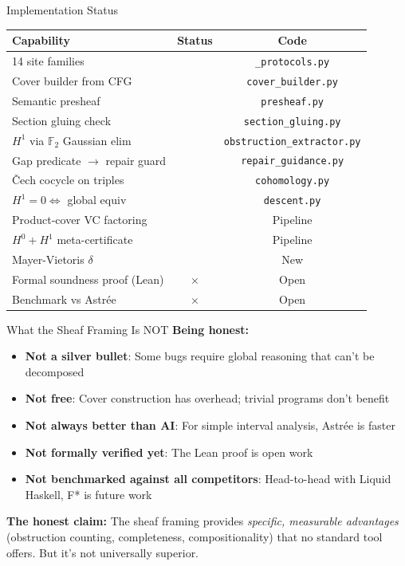 \documentclass[aspectratio=169,10pt]{beamer}
\newcommand{\yes}{\textcolor{good}{\checkmark}}
\newcommand{\no}{\textcolor{meh}{$\times$}}
\begin{document}
\begin{frame}{Implementation Status}
\renewcommand{\arraystretch}{1.15}
\footnotesize
\begin{tabular}{@{}p{6.5cm}cc@{}}
\toprule
\textbf{Capability} & \textbf{Status} & \textbf{Code} \\
\midrule
14 site families & \yes & \texttt{\_protocols.py} \\
Cover builder from CFG & \yes & \texttt{cover\_builder.py} \\
Semantic presheaf & \yes & \texttt{presheaf.py} \\
Section gluing check & \yes & \texttt{section\_gluing.py} \\
$H^1$ via $\mathbb{F}_2$ Gaussian elim & \yes & \texttt{obstruction\_extractor.py} \\
Gap predicate $\to$ repair guard & \yes & \texttt{repair\_guidance.py} \\
\v{C}ech cocycle on triples & \yes & \texttt{cohomology.py} \\
$H^1 = 0 \Leftrightarrow$ global equiv & \yes & \texttt{descent.py} \\
Product-cover VC factoring & \yes & Pipeline \\
$H^0 + H^1$ meta-certificate & \yes & Pipeline \\
Mayer-Vietoris $\delta$ & \yes & New \\
\midrule
Formal soundness proof (Lean) & \no & Open \\
Benchmark vs Astr\'ee & \no & Open \\
\bottomrule
\end{tabular}
\end{frame}

\begin{frame}{What the Sheaf Framing Is NOT}
\textbf{Being honest:}

\begin{itemize}
  \item \textbf{Not a silver bullet}: Some bugs require global reasoning that can't be decomposed
  \item \textbf{Not free}: Cover construction has overhead; trivial programs don't benefit
  \item \textbf{Not always better than AI}: For simple interval analysis, Astr\'ee is faster
  \item \textbf{Not formally verified yet}: The Lean proof is open work
  \item \textbf{Not benchmarked against all competitors}: Head-to-head with Liquid Haskell, F* is future work
\end{itemize}

\vspace{0.3em}
\textbf{The honest claim:} The sheaf framing provides \emph{specific, measurable advantages} (obstruction counting, completeness, compositionality) that no standard tool offers. But it's not universally superior.
\end{frame}
\end{document}
